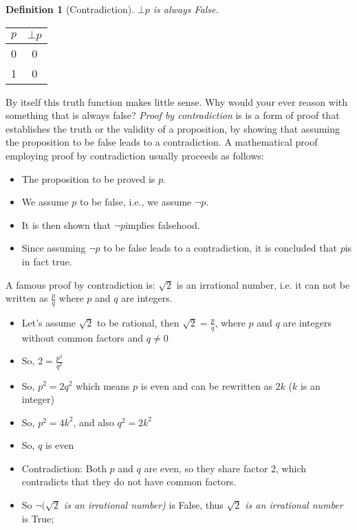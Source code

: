 \documentclass[10pt,a4paper,draft,titlepage,onecolumn]{book}
\newtheorem{definition}{Definition}[subsection]
\begin{document}
\begin{definition}[Contradiction] $\bot p$ is always False.
\end{definition}  
\begin{center}
\begin{tabular}{ |c|c| }
 \hline
 $p$ &  ${\bot}p $ \\
 \hline
 0 &  0 \\
 1 &  0\\
 \hline
\end{tabular}
\end{center}
By itself this truth function makes little sense. Why would your ever reason with something that is always false?
\textit{Proof by contradiction } is  is a form of proof that establishes the truth or the validity of a proposition, by showing that assuming the proposition to be false leads to a contradiction. 
A mathematical proof employing proof by contradiction usually proceeds as follows:
\begin{itemize}
\item The proposition to be proved is $p$.
\item We assume $p$ to be false, i.e., we assume $\neg p$.
\item It is then shown that $\neg p$implies falsehood. 
\item Since assuming $\neg p$ to be false leads to a contradiction, it is concluded that $ p$is in fact true.
\end{itemize}
A famous proof by contradiction is: $\sqrt{2}$ is an irrational number, i.e. it can not be written as  $\frac{p}{q}$ where $p$ and $q$ are integers.
\begin{itemize}
\item Let's assume $\sqrt{2}$  to  be rational, then $\sqrt{2} = \frac{p}{q}$, where $p$ and $q$ are integers without common factors and $q \neq 0$
\item So, $ 2 = \frac{p^2}{q^2} $   
\item So, $ p^2 = 2{q^2} $ which means $p$ is even and can be rewritten as $ 2k$ ($k$ is an integer)
\item So,  $ p^2 = 4k^2$, and also $ q^2 = 2k^2$
\item So, $q$ is even
\item Contradiction: Both $p$ and $q$ are even, so they share factor 2, which contradicts that they do not have common factors.  
\item So  \textit{${\neg}(\sqrt{2}$ is an irrational number)} is False, thus  \textit{$\sqrt{2}$ is an irrational number }is True; 
\end{itemize}
\end{document}
